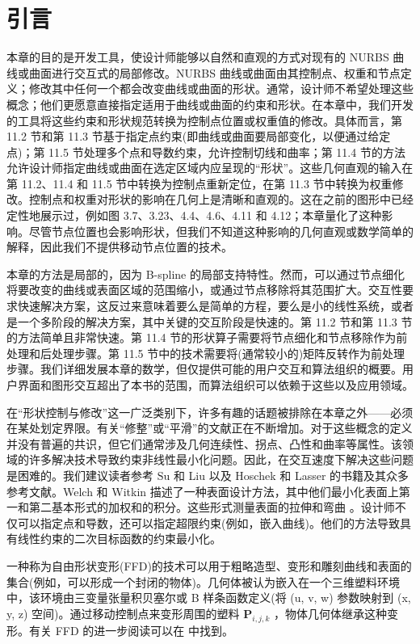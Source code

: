 \documentclass[../main.tex]{subfiles}
\begin{document}
\section{引言}

本章的目的是开发工具，使设计师能够以自然和直观的方式对现有的 NURBS 曲线或曲面进行交互式的局部修改。NURBS 曲线或曲面由其控制点、权重和节点定义；修改其中任何一个都会改变曲线或曲面的形状。通常，设计师不希望处理这些概念；他们更愿意直接指定适用于曲线或曲面的约束和形状。在本章中，我们开发的工具将这些约束和形状规范转换为控制点位置或权重值的修改。具体而言，第 11.2 节和第 11.3 节基于指定点约束(即曲线或曲面要局部变化，以便通过给定点)；第 11.5 节处理多个点和导数约束，允许控制切线和曲率；第 11.4 节的方法允许设计师指定曲线或曲面在选定区域内应呈现的“形状”。这些几何直观的输入在第 11.2、11.4 和 11.5 节中转换为控制点重新定位，在第 11.3 节中转换为权重修改。控制点和权重对形状的影响在几何上是清晰和直观的。这在之前的图形中已经定性地展示过，例如图 3.7、3.23、4.4、4.6、4.11 和 4.12；本章量化了这种影响。尽管节点位置也会影响形状，但我们不知道这种影响的几何直观或数学简单的解释，因此我们不提供移动节点位置的技术。

本章的方法是局部的，因为 B-spline 的局部支持特性。然而，可以通过节点细化将要改变的曲线或表面区域的范围缩小，或通过节点移除将其范围扩大。交互性要求快速解决方案，这反过来意味着要么是简单的方程，要么是小的线性系统，或者是一个多阶段的解决方案，其中关键的交互阶段是快速的。第 11.2 节和第 11.3 节的方法简单且非常快速。第 11.4 节的形状算子需要将节点细化和节点移除作为前处理和后处理步骤。第 11.5 节中的技术需要将(通常较小的)矩阵反转作为前处理步骤。我们详细发展本章的数学，但仅提供可能的用户交互和算法组织的概要。用户界面和图形交互超出了本书的范围，而算法组织可以依赖于这些以及应用领域。

在“形状控制与修改”这一广泛类别下，许多有趣的话题被排除在本章之外——必须在某处划定界限。有关“修整”或“平滑”的文献正在不断增加。对于这些概念的定义并没有普遍的共识，但它们通常涉及几何连续性、拐点、凸性和曲率等属性。该领域的许多解决技术导致约束非线性最小化问题。因此，在交互速度下解决这些问题是困难的。我们建议读者参考 \(\mathrm{{Su}}\) 和 Liu \cite{Su89} 以及 Hoschek 和 Lasser \cite{Hosc93} 的书籍及其众多参考文献。Welch 和 Witkin \cite{Welc92} 描述了一种表面设计方法，其中他们最小化表面上第一和第二基本形式的加权和的积分。这些形式测量表面的拉伸和弯曲 \cite{DoCa76}。设计师不仅可以指定点和导数，还可以指定超限约束(例如，嵌入曲线)。他们的方法导致具有线性约束的二次目标函数的约束最小化。

一种称为自由形状变形(FFD)的技术可以用于粗略造型、变形和雕刻曲线和表面的集合(例如，可以形成一个封闭的物体)。几何体被认为嵌入在一个三维塑料环境中，该环境由三变量张量积贝塞尔或 B 样条函数定义(将 (u, v, w) 参数映射到 (x, y, z) 空间)。通过移动控制点来变形周围的塑料 \({\mathbf{P}}_{i,j,k}\) ，物体几何体继承这种变形。有关 FFD 的进一步阅读可以在 \cite{Sede86,Coqu90,Coqu91,Hsu92} 中找到。
\end{document}
